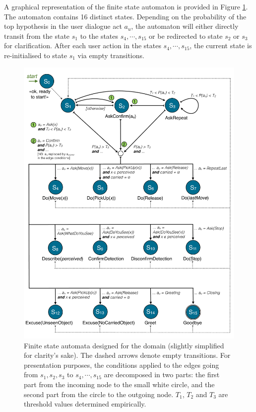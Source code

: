 A graphical representation of the finite state automaton is provided in Figure \ref{fig:fsa-exp3}.  The automaton contains 16 distinct states.  Depending on the probability of the top hypothesis in the user dialogue act $a_u$, the automaton will either directly transit from the state $s_1$ to the states $s_4, \cdots, s_{15}$ or be redirected to state $s_2$ or $s_3$ for clarification. After each user action in the states $s_4, \cdots, s_{15}$, the current state is re-initialised to state $s_1$ via empty transitions. 


\begin{figure}[p]
\centering
\includegraphics[scale=0.36]{imgs/fsa-exp3.pdf} 
\caption{Finite state automata designed for the domain (slightly simplified for clarity's sake). The dashed arrows denote empty transitions. For presentation purposes, the conditions applied to the edges going from $s_1,s_2,s_3$ to $s_4, \cdots, s_{15}$ are decomposed in two parts: the first part from the incoming node to the small white circle, and the second part from the circle to the outgoing node. $T_1$, $T_2$ and $T_3$ are threshold values determined empirically.}
\label{fig:fsa-exp3}
\end{figure}



